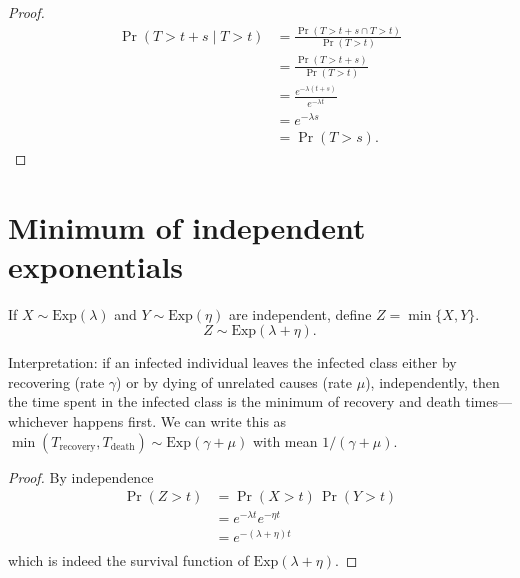 \begin{proof}
\begin{align*}
  \Pr(T> t+s\mid T> t) &= \frac{\Pr(T> t+s \cap T > t)}{\Pr(T > t)}\\
  &= \frac{\Pr(T> t+s)}{\Pr(T> t)}\\
  &= \frac{e^{-\lambda(t+s)}}{e^{-\lambda t}}\\
  &= e^{-\lambda s} \\
  &= \Pr(T> s).
\end{align*}
\end{proof}

\section{Minimum of independent exponentials}

\begin{proposition}
  If $X\sim\text{Exp}(\lambda)$ and $Y\sim\text{Exp}(\eta)$ are
  independent, define $Z=\min\{X,Y\}$.
\[
Z\sim\text{Exp}(\lambda+\eta).
\]
\end{proposition}

Interpretation: if an infected individual leaves the infected class
either by recovering (rate $\gamma$) or by dying of unrelated causes
(rate $\mu$), independently, then the time spent in the infected class
is the minimum of recovery and death times--- whichever happens
first. We can write this as $\min(T_{\text{recovery}},
T_{\text{death}})\sim\text{Exp}(\gamma+\mu)$ with mean
$1/(\gamma+\mu)$.

\begin{proof}
By independence
\begin{align*}
  \Pr(Z>t) &= \Pr(X>t)\,\Pr(Y>t) \\
  &= e^{-\lambda t}e^{-\eta t}\\
  &= e^{-(\lambda+\eta)t} \\
\end{align*}
which is indeed the survival function of $\text{Exp}(\lambda+\eta)$.
\end{proof}
